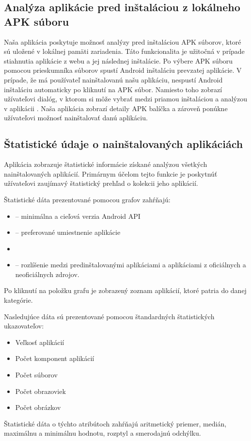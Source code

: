 \subsection{Analýza aplikácie pred inštaláciou z lokálneho APK súboru}
Naša aplikácia poskytuje možnosť analýzy pred inštaláciou APK súborov, ktoré sú uložené v lokálnej pamäti zariadenia. Táto funkcionalita je užitočná v prípade stiahnutia aplikácie z webu a jej následnej inštalácie. Po výbere APK súboru pomocou prieskumníka súborov spustí Android inštaláciu prevzatej aplikácie. V prípade, že má používateľ nainštalovanú našu aplikáciu, nespustí Android inštaláciu automaticky po kliknutí na APK súbor. Namiesto toho zobrazí užívateľovi dialóg, v ktorom si môže vybrať medzi priamou inštaláciou a analýzou v aplikácii . Naša aplikácia zobrazí detaily APK balíčka a zároveň ponúkne užívateľovi možnosť nainštalovať danú aplikáciu.

\subsection{Štatistické údaje o nainštalovaných aplikáciách}
Aplikácia zobrazuje štatistické informácie získané analýzou všetkých nainštalovaných aplikácií. Primárnym účelom tejto funkcie je poskytnúť užívateľovi zaujímavý štatistický prehľad o kolekcii jeho aplikácií. 

\noindent Štatistické dáta prezentované pomocou grafov zahŕňajú:
\begin{itemize}
	\item {} -- minimálna a cieľová verzia Android API
	\item {} -- preferované umiestnenie aplikácie
	\item {}
	\item {} -- rozlíšenie medzi predinštalovanými aplikáciami a aplikáciami z oficiálnych a neoficiálnych zdrojov. 
\end{itemize}

\noindent Po kliknutí na položku grafu je zobrazený zoznam aplikácií, ktoré patria do danej kategórie.

\noindent Nasledujúce dáta sú prezentované pomocou štandardných štatistických ukazovateľov:
\begin{itemize}
	\item Veľkosť aplikácií
	\item Počet komponent aplikácií
	\item Počet súborov
	\item Počet obrazoviek
	\item Počet obrázkov
\end{itemize}
Štatistické dáta o týchto atribútoch zahŕňajú aritmetický priemer, medián, maximálnu a minimálnu hodnotu, rozptyl a smerodajnú odchýlku. 


